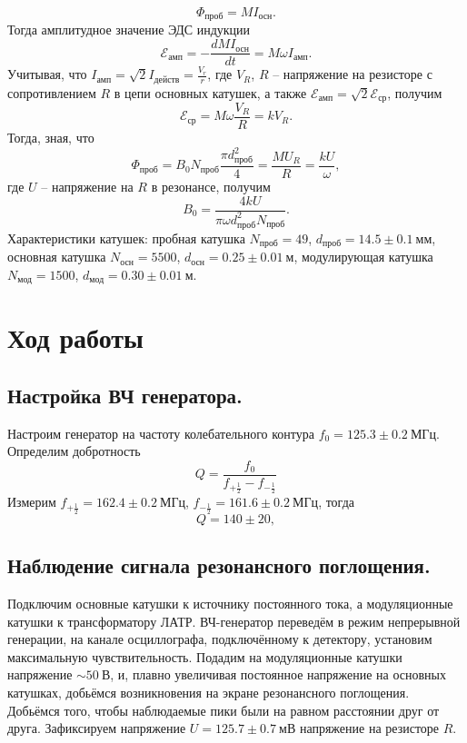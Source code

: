 \documentclass[a4paper,12pt]{article}
\begin{document}
    \[\Phi_{\text{проб}} = M I_{\text{осн}}.\]
    Тогда амплитудное значение ЭДС индукции
    \[\mathcal{E}_{\text{амп}} = - \dfrac{dM I_{\text{осн}}}{dt} = M \omega I_{\text{амп}}.\]
    Учитывая, что $I_{\text{амп}} = \sqrt{2} I_{\text{действ}}=\frac{V_r}{r}$, где $V_R$, $R$ -- напряжение на резисторе с сопротивлением $R$ в цепи основных катушек, а также $\mathcal{E}_{\text{амп}} = \sqrt{2}\mathcal{E}_{\text{ср}}$, получим
    \[\mathcal{E}_{\text{ср}} = M \omega \dfrac{V_R}{R} = k V_R.\]
    Тогда, зная, что
    \[\Phi_{\text{проб}} = B_0 N_{\text{проб}} \dfrac{\pi d_{\text{проб}}^2}{4} =  \dfrac{MU_R}{R} = \dfrac{k U}{\omega},\]
    где $U$ -- напряжение на $R$ в резонансе, получим
    \begin{equation}\label{1}
    B_0 = \dfrac{4k U}{\pi \omega d^2_{\text{проб}} N_{\text{проб}}}.
    \end{equation}
    Характеристики катушек: пробная катушка $N_{\text{проб}} = 49$, $d_{\text{проб}} = 14.5\pm 0.1~\text{мм}$, основная катушка $N_{\text{осн}} = 5500$, $d_{\text{осн}} = 0.25\pm 0.01~\text{м}$,  модулирующая катушка $N_{\text{мод}} = 1500$, $d_{\text{мод}} = 0.30\pm 0.01~\text{м}$.


\section*{Ход работы}

\subsection*{Настройка ВЧ генератора.}
    Настроим генератор на частоту колебательного контура $f_0 = 125.3 \pm 0.2~\text{МГц}$.
    Определим добротность
    $$ Q = \dfrac{f_0}{f_{+\frac{1}{2}} - f_{-\frac{1}{2}}} $$
    Измерим $f_{+\frac{1}{2}} = 162.4 \pm 0.2~\text{МГц}$, $f_{-\frac{1}{2}} = 161.6 \pm 0.2~\text{МГц}$, тогда
    \[Q = 140 \pm 20,\]

\subsection*{Наблюдение сигнала резонансного поглощения.}
    Подключим основные катушки к источнику постоянного тока, а модуляционные катушки к трансформатору ЛАТР. 
    ВЧ-генератор переведём в режим непрерывной генерации, на канале осциллографа, подключённому к детектору, установим максимальную чувствительность. 
    Подадим на модуляционные катушки напряжение $\sim 50~\text{В}$, и, плавно увеличивая постоянное напряжение на основных катушках, 
    добьёмся возникновения на экране резонансного поглощения. Добьёмся того, чтобы наблюдаемые пики были на равном расстоянии друг от друга. 
    Зафиксируем напряжение $U = 125.7 \pm 0.7~\text{мВ}$ напряжение на резисторе $R$.
\end{document}
